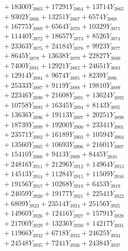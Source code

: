 \documentclass[a4paper,10pt]{article}
\begin{document}
{\begin{align}
&\;  + 18300 Y_{3863} + 17291 Y_{3864} + 13714 Y_{3865} \\[0.3ex]
&\;  + 9302 Y_{3866} + 13251 Y_{3867} + 6574 Y_{3868} \\[0.5ex]\allowbreak
&\;  + 16775 Y_{3869} + 6564 Y_{3870} + 10329 Y_{3871} \\[0.3ex]
&\;  + 11440 Y_{3872} + 18657 Y_{3873} + 8526 Y_{3874} \\[0.3ex]
&\;  + 23363 Y_{3875} + 24184 Y_{3876} + 9923 Y_{3877} \\[0.3ex]
&\;  + 8645 Y_{3878} + 13638 Y_{3879} + 22827 Y_{3880} \\[0.3ex]
&\;  + 7400 Y_{3881} + 12921 Y_{3882} + 24651 Y_{3883} \\[0.3ex]
&\;  + 12914 Y_{3884} + 9674 Y_{3885} + 8239 Y_{3886} \\[0.3ex]
&\;  + 25333 Y_{3887} + 9119 Y_{3888} + 19810 Y_{3889} \\[0.3ex]
&\;  + 22346 Y_{3890} + 21608 Y_{3891} + 13624 Y_{3892} \\[0.3ex]
&\;  + 10758 Y_{3893} + 16345 Y_{3894} + 8143 Y_{3895} \\[0.3ex]
&\;  + 13636 Y_{3896} + 19113 Y_{3897} + 20251 Y_{3898} \\[0.5ex]\allowbreak
&\;  + 18739 Y_{3899} + 19200 Y_{3900} + 23341 Y_{3901} \\[0.3ex]
&\;  + 23571 Y_{3902} + 16189 Y_{3903} + 10594 Y_{3904} \\[0.3ex]
&\;  + 13560 Y_{3905} + 10693 Y_{3906} + 21601 Y_{3907} \\[0.3ex]
&\;  + 15410 Y_{3908} + 9413 Y_{3909} + 8445 Y_{3910} \\[0.3ex]
&\;  + 24816 Y_{3911} + 21296 Y_{3912} + 14964 Y_{3913} \\[0.3ex]
&\;  + 14513 Y_{3914} + 11284 Y_{3915} + 11509 Y_{3916} \\[0.3ex]
&\;  + 19156 Y_{3917} + 10268 Y_{3918} + 6453 Y_{3919} \\[0.3ex]
&\;  + 24059 Y_{3920} + 19177 Y_{3921} + 22541 Y_{3922} \\[0.3ex]
&\;  + 6809 Y_{3923} + 23514 Y_{3924} + 25156 Y_{3925} \\[0.3ex]
&\;  + 14960 Y_{3926} + 12416 Y_{3927} + 15791 Y_{3928} \\[0.5ex]\allowbreak
&\;  + 21700 Y_{3929} + 13236 Y_{3930} + 14217 Y_{3931} \\[0.3ex]
&\;  + 11966 Y_{3932} + 6718 Y_{3933} + 24625 Y_{3934} \\[0.3ex]
&\;  + 24548 Y_{3935} + 7241 Y_{3936} + 24384 Y_{3937} \\[0.3ex]

\end{align}}
\end{document}

